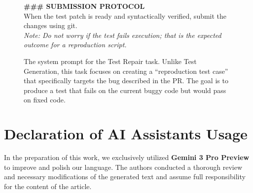 \documentclass[11pt]{article}
\begin{document}
\begin{figure}[t!]
\begin{tcolorbox}
    \vspace{10pt}
    
    \textbf{\#\#\# SUBMISSION PROTOCOL} \\
    When the test patch is ready and syntactically verified, submit the changes using git. \\
    \textit{Note: Do not worry if the test fails execution; that is the expected outcome for a reproduction script.}

    \end{tcolorbox}
    \caption{The system prompt for the Test Repair task. Unlike Test Generation, this task focuses on creating a ``reproduction test case'' that specifically targets the bug described in the PR. The goal is to produce a test that fails on the current buggy code but would pass on fixed code.}
    \label{fig:testrepair_prompt}
\end{figure}

\section{Declaration of AI Assistants Usage}
In the preparation of this work, we exclusively utilized \textbf{Gemini 3 Pro Preview} to improve and polish our language. The authors conducted a thorough review and necessary modifications of the generated text and assume full responsibility for the content of the article.
\end{document}
